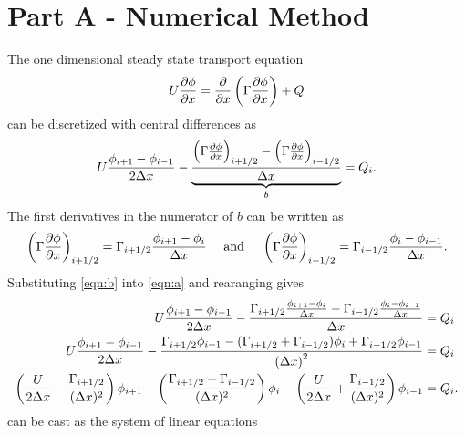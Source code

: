 \documentclass[reqno, 12pt]{article}
\begin{document}
    \section*{Part A - Numerical Method}
    \noindent The one dimensional steady state transport equation
    \begin{equation*}
        U\pdiff[\phi]{x} = \pdiff{x}\left(\Gamma \pdiff[\phi]{x}\right) + Q
    \end{equation*}
    can be discretized with central differences as
    \begin{equation}
        U\frac{\phi_{i + 1} - \phi_{i - 1}}{2\Delta x} - \underbrace{\frac{\left(\Gamma\pdiff[\phi]{x}\right)_{i + 1/2} - \left(\Gamma \pdiff[\phi]{x}\right)_{i - 1/2}}{\Delta x}}_{b} = Q_i.
    \label{eqn:a}
    \end{equation}
    The first derivatives in the numerator of $b$ can be written as
    \begin{equation}
        \left(\Gamma\pdiff[\phi]{x}\right)_{i + 1/2} = \Gamma_{i + 1/2}\frac{\phi_{i + 1} - \phi_{i}}{\Delta x}\quad \text{ and  }\quad \left(\Gamma\pdiff[\phi]{x}\right)_{i - 1/2} = \Gamma_{i - 1/2}\frac{\phi_{i} - \phi_{i-1}}{\Delta x}.
    \label{eqn:b}
    \end{equation}
    Substituting \cref{eqn:b} into \cref{eqn:a} and rearanging gives
    \begin{align}
    U\frac{\phi_{i + 1} - \phi_{i - 1}}{2\Delta x} -
    \frac{\Gamma_{i + 1/2}\frac{\phi_{i + 1} - \phi_{i}}{\Delta x} - \Gamma_{i - 1/2}\frac{\phi_{i} - \phi_{i - 1}}{\Delta x}}{\Delta x} & = Q_i \notag \\
    U\frac{\phi_{i + 1} - \phi_{i - 1}}{2\Delta x} -
    \frac{\Gamma_{i + 1/2}\phi_{i + 1} - (\Gamma_{i + 1/2} + \Gamma_{i - 1/2})\phi_{i} + \Gamma_{i - 1/2}\phi_{i -1}}{\left(\Delta x\right)^2} &= Q_i \notag \\
    \left(\frac{U}{2\Delta x} - \frac{\Gamma_{i + 1/2}}{(\Delta x)^2}\right)\phi_{i + 1} +
    \left(\frac{\Gamma_{i + 1/2} + \Gamma_{i - 1/2}}{(\Delta x)^2}\right)\phi_i -
    \left(\frac{U}{2\Delta x} + \frac{\Gamma_{i - 1/2}}{(\Delta x)^2}\right)\phi_{i - 1} &= Q_i \label{eqn:c}.
    \end{align}
     can be cast as the system of linear equations
\end{document}
